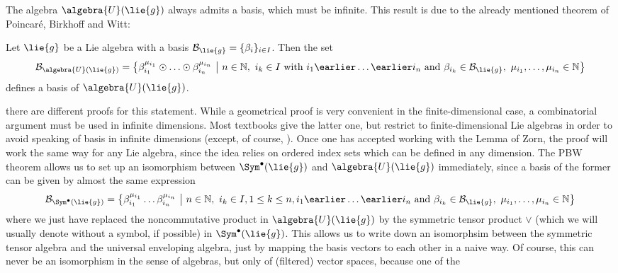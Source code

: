 The algebra $\algebra{U}(\lie{g})$ always admits a basis, which must be 
infinite. This result is due to the already mentioned theorem of 
Poincar\'e, Birkhoff and Witt:
\begin{theorem}
	\label{Thm:Alg:PBW}
	Let $\lie{g}$ be a Lie algebra with a basis $\mathcal{B}_{\lie{g}} = \{ 
	\beta_i \}_{i \in I}$. Then the set
	\begin{equation*}
		\mathcal{B}_{\algebra{U}(\lie{g})}
		=
		\big\{
			\beta_{i_1}^{\mu_{i_1}}
			\odot \ldots \odot
			\beta_{i_n}^{\mu_{i_n}}
		\ \big| \
			n \in \mathbb{N}, \ 
			i_k \in I
			\text{ with } i_1 \earlier \ldots \earlier i_n 
			\text{ and } \beta_{i_k} \in \mathcal{B}_{\lie{g}}, \
			\mu_{i_1}, \ldots, \mu_{i_n} \in \mathbb{N}
		\big\}
	\end{equation*}
	defines a basis of $\algebra{U}(\lie{g})$.
\end{theorem}
there are different proofs for this statement. While a geometrical proof is 
very convenient in the finite-dimensional case, a combinatorial argument must 
be used in infinite dimensions. Most textbooks give the latter one, but 
restrict to finite-dimensional Lie algebras in order to avoid speaking of 
basis in infinite dimensions (except, of course, \cite{bourbaki:}). Once one 
has accepted working with the Lemma of Zorn, the proof will work the same way 
for any Lie algebra, since the idea relies on ordered index sets which can be 
defined in any dimension.
The PBW theorem allows us to set up an isomorphism between $\Sym^{\bullet}
(\lie{g})$ and $\algebra{U}(\lie{g})$ immediately, since a basis of the former 
can be given by almost the same expression
\begin{equation*}
	\mathcal{B}_{\Sym^{\bullet}(\lie{g})}
	=
	\big\{
		\beta_{i_1}^{\mu_{i_1}}
		\ldots
		\beta_{i_n}^{\mu_{i_n}}
	\ \big| \
		n \in \mathbb{N}, \ 
		i_k \in I, 1 \leq k \leq n,
		i_1 \earlier \ldots \earlier i_n 
		\text{ and } \beta_{i_k} \in \mathcal{B}_{\lie{g}}, \
		\mu_{i_1}, \ldots, \mu_{i_n} \in \mathbb{N}
	\big\}
\end{equation*}
where we just have replaced the noncommutative product in $\algebra{U}
(\lie{g})$ by the symmetric tensor product $\vee$ (which we will usually 
denote without a symbol, if possible) in $\Sym^{\bullet}(\lie{g})$. This 
allows us to write down an isomorphsim between the symmetric tensor algebra 
and the universal enveloping algebra, just by mapping the basis vectors to 
each other in a naive way. Of course, this can never be an isomorphism in the 
sense of algebras, but only of (filtered) vector spaces, because one of the 
